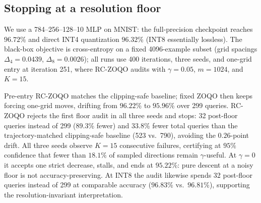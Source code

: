 \documentclass{article}
\newcommand{\D}{\Delta}
\begin{document}
\subsection{Stopping at a resolution floor}
We use a 784--256--128--10 MLP on MNIST: the full-precision checkpoint reaches $96.72$\% and direct INT4 quantization $96.32$\% (INT8 essentially lossless). The black-box objective is cross-entropy on a fixed 4096-example subset (grid spacings $\D_4=0.0439$, $\D_8=0.0026$); all runs use 400 iterations, three seeds, and one-grid entry at iteration 251, where RC-ZOQO audits with $\gamma=0.05$, $m=1024$, and $K=15$.

Pre-entry RC-ZOQO matches the clipping-safe baseline; fixed ZOQO then keeps forcing one-grid moves, drifting from $96.22$\% to $95.96$\% over 299 queries. RC-ZOQO rejects the first floor audit in all three seeds and stops: 32 post-floor queries instead of 299 ($89.3$\% fewer) and $33.8$\% fewer total queries than the trajectory-matched clipping-safe baseline (523 vs.~790), avoiding the $0.26$-point drift. All three seeds observe $K=15$ consecutive failures, certifying at $95\%$ confidence that fewer than $18.1\%$ of sampled directions remain $\gamma$-useful. At $\gamma=0$ it accepts one strict decrease, stalls, and ends at $95.22$\%: pure descent at a noisy floor is not accuracy-preserving. At INT8 the audit likewise spends 32 post-floor queries instead of 299 at comparable accuracy ($96.83$\% vs.~$96.81$\%), supporting the resolution-invariant interpretation.
\end{document}
